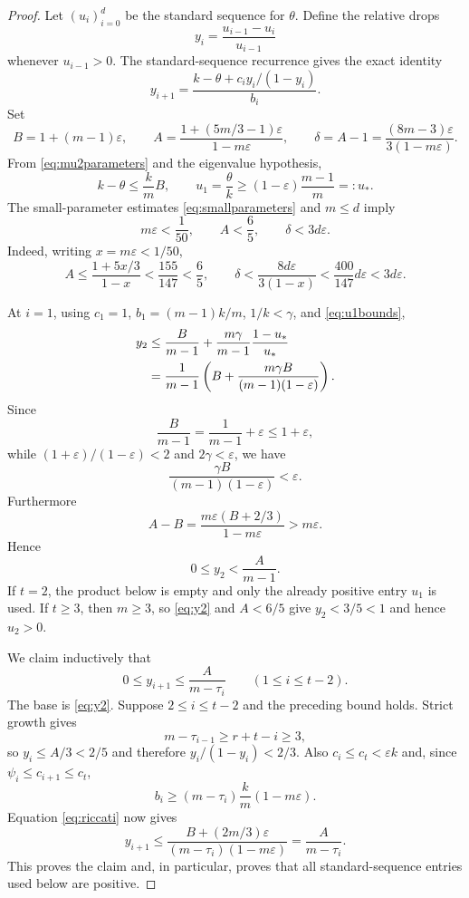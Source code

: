 \documentclass[11pt]{amsart}
\theoremstyle{definition}
\newcommand{\eps}{\varepsilon}
\newcommand{\gam}{\gamma}
\begin{document}
\begin{proof}
Let $(u_i)_{i=0}^{d}$ be the standard sequence for $\theta$.  Define the relative drops
\begin{equation}\label{eq:ydef}
  y_i=\frac{u_{i-1}-u_i}{u_{i-1}}
\end{equation}
whenever $u_{i-1}>0$.  The standard-sequence recurrence gives the exact identity
\begin{equation}\label{eq:riccati}
  y_{i+1}
  =\frac{k-\theta+c_i y_i/(1-y_i)}{b_i}.
\end{equation}
Set
\begin{equation}\label{eq:BA}
  B=1+(m-1)\eps,
  \qquad
  A=\frac{1+(5m/3-1)\eps}{1-m\eps},
  \qquad
  \delta=A-1=\frac{(8m-3)\eps}{3(1-m\eps)}.
\end{equation}
From \eqref{eq:mu2parameters} and the eigenvalue hypothesis,
\begin{equation}\label{eq:u1bounds}
  k-\theta\le\frac{k}{m}B,
  \qquad
  u_1=\frac\theta k\ge(1-\eps)\frac{m-1}{m}=:u_*.
\end{equation}
The small-parameter estimates \eqref{eq:smallparameters} and $m\le d$ imply
\begin{equation}\label{eq:Asmall}
  m\eps<\frac1{50},
  \qquad A<\frac65,
  \qquad \delta<3d\eps.
\end{equation}
Indeed, writing $x=m\eps<1/50$,
\[
  A\le\frac{1+5x/3}{1-x}
  <\frac{155}{147}<\frac65,
  \qquad
  \delta<\frac{8d\eps}{3(1-x)}
  <\frac{400}{147}d\eps<3d\eps.
\]

At $i=1$, using $c_1=1$, $b_1=(m-1)k/m$, $1/k<\gam$, and \eqref{eq:u1bounds},
\begin{align}
 y_2
 &\le \frac{B}{m-1}
 +\frac{m\gam}{m-1}\frac{1-u_*}{u_*}\notag\\
 &=\frac1{m-1}\left(
 B+\frac{m\gam B}{(m-1)(1-\eps)}
 \right).\label{eq:y2raw}
\end{align}
Since
\[
  \frac{B}{m-1}=\frac1{m-1}+\eps\le1+\eps,
\]
while $(1+\eps)/(1-\eps)<2$ and $2\gam<\eps$, we have
\[
  \frac{\gam B}{(m-1)(1-\eps)}<\eps.
\]
Furthermore
\[
 A-B=\frac{m\eps(B+2/3)}{1-m\eps}>m\eps.
\]
Hence
\begin{equation}\label{eq:y2}
  0\le y_2<\frac{A}{m-1}.
\end{equation}
If $t=2$, the product below is empty and only the already positive entry $u_1$ is used.  If $t\ge3$, then $m\ge3$, so \eqref{eq:y2} and $A<6/5$ give $y_2<3/5<1$ and hence $u_2>0$.

We claim inductively that
\begin{equation}\label{eq:yinduction}
  0\le y_{i+1}\le\frac{A}{m-\tau_i}
  \qquad(1\le i\le t-2).
\end{equation}
The base is \eqref{eq:y2}.  Suppose $2\le i\le t-2$ and the preceding bound holds.  Strict growth gives
\[
  m-\tau_{i-1}\ge r+t-i\ge3,
\]
so $y_i\le A/3<2/5$ and therefore $y_i/(1-y_i)<2/3$.  Also $c_i\le c_t<\eps k$ and, since $\psi_i\le c_{i+1}\le c_t$,
\[
  b_i\ge(m-\tau_i)\frac{k}{m}(1-m\eps).
\]
Equation \eqref{eq:riccati} now gives
\[
  y_{i+1}
  \le\frac{B+(2m/3)\eps}{(m-\tau_i)(1-m\eps)}
  =\frac{A}{m-\tau_i}.
\]
This proves the claim and, in particular, proves that all standard-sequence entries used below are positive.


\end{proof}
\end{document}
